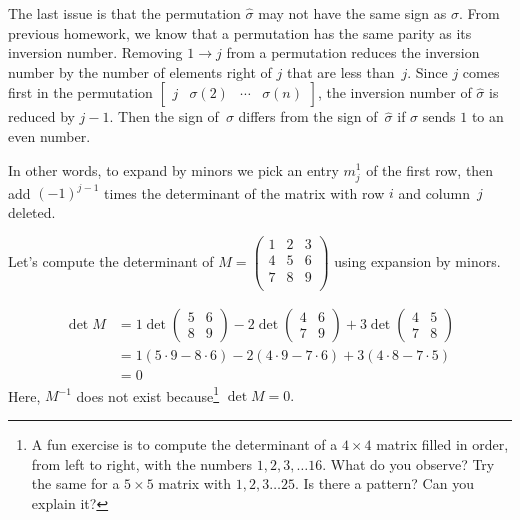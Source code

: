 The last issue is that the permutation $\hat{\sigma}$ may not have the same sign as $\sigma$.  From previous homework, we know that a permutation has the same parity as its inversion number.  Removing $1\rightarrow j$ from a permutation  reduces the inversion number by the number of elements right of $j$ that are less than~$j$.  Since $j$ comes first in the permutation $\begin{bmatrix}j & \sigma(2) & \cdots & \sigma(n) \end{bmatrix}$, the inversion number of $\hat{\sigma}$ is reduced by $j-1$.  Then the sign of~$\sigma$ differs from the sign of~$\hat{\sigma}$ if $\sigma$ sends $1$ to an even number.

In other words, to expand by minors we pick an entry $m^1_j$ of the first row, then add $(-1)^{j-1}$ times the determinant of the matrix with row $i$ and column~$j$ deleted.

\begin{example}
Let's compute the determinant of 
$M=\begin{pmatrix}
1 & 2 & 3 \\
4 & 5 & 6 \\
7 & 8 & 9 \\
\end{pmatrix}$ using expansion by minors.

\begin{align*}
\det M & = 1\det \begin{pmatrix}
5 & 6 \\
8 & 9
\end{pmatrix}
-2 \det \begin{pmatrix}
4 & 6 \\
7 & 9
\end{pmatrix}
+3 \det \begin{pmatrix}
4 & 5 \\
7 & 8
\end{pmatrix} \\
& = 1(5\cdot 9- 8\cdot 6) -2 (4\cdot 9- 7\cdot 6) + 3 (4\cdot 8- 7\cdot 5) \\
& = 0
\end{align*}
Here, $M^{-1}$ does not exist because\footnote{A fun exercise is to compute the determinant of a $4\times 4$ matrix filled in order, from left to right,  with the numbers $1,2,3,\ldots 16$. What do you observe? Try the same for a $5\times 5$ matrix with $1,2,3\ldots 25$. Is there a pattern? Can you explain it?} $\det M=0.$
\end{example}


